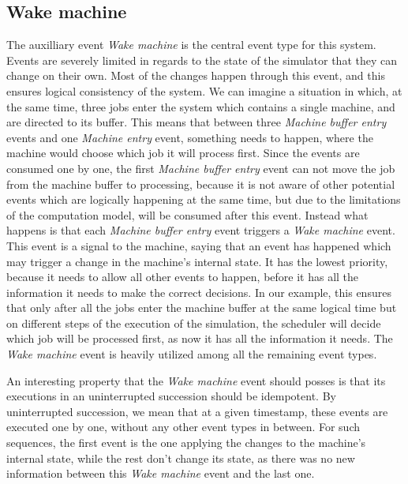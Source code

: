 \subsection{Wake machine}
The auxilliary event \textit{Wake machine} is the central event type for this system. Events are severely limited in regards to the state of the simulator that they can change on their own. Most of the changes happen through this event, and this ensures logical consistency of the system. We can imagine a situation in which, at the same time, three jobs enter the system which contains a single machine, and are directed to its buffer. This means that between three \textit{Machine buffer entry} events and one \textit{Machine entry} event, something needs to happen, where the machine would choose which job it will process first. Since the events are consumed one by one, the first \textit{Machine buffer entry} event can not move the job from the machine buffer to processing, because it is not aware of other potential events which are logically happening at the same time, but due to the limitations of the computation model, will be consumed after this event. Instead what happens is that each \textit{Machine buffer entry} event triggers a \textit{Wake machine} event. This event is a signal to the machine, saying that an event has happened which may trigger a change in the machine's internal state. It has the lowest priority, because it needs to allow all other events to happen, before it has all the information it needs to make the correct decisions. In our example, this ensures that only after all the jobs enter the machine buffer at the same logical time but on different steps of the execution of the simulation, the scheduler will decide which job will be processed first, as now it has all the information it needs. The \textit{Wake machine} event is heavily utilized among all the remaining event types.

An interesting property that the \textit{Wake machine} event should posses is that its executions in an uninterrupted succession should be idempotent. By uninterrupted succession, we mean that at a given timestamp, these events are executed one by one, without any other event types in between. For such sequences, the first event is the one applying the changes to the machine's internal state, while the rest don't change its state, as there was no new information between this \textit{Wake machine} event and the last one.

